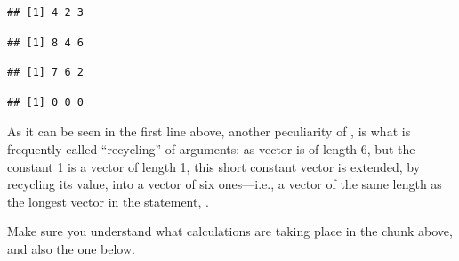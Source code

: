 \documentclass[krantz2]{krantz}\usepackage{knitr}
\begin{document}
\begin{knitrout}\footnotesize
{}\color{fgcolor}\begin{kframe}
\begin{alltt}
 \hlopt{+}  
\end{alltt}
\begin{verbatim}
## [1] 4 2 3
\end{verbatim}
\begin{alltt}
 \hlopt{+} \hlstd{)} \hlopt{*} 
\end{alltt}
\begin{verbatim}
## [1] 8 4 6
\end{verbatim}
\begin{alltt}
 \hlopt{+} 
\end{alltt}
\begin{verbatim}
## [1] 7 6 2
\end{verbatim}
\begin{alltt}
 \hlopt{-} 
\end{alltt}
\begin{verbatim}
## [1] 0 0 0
\end{verbatim}
\end{kframe}
\end{knitrout}

As it can be seen in the first line above, another peculiarity of \Rpgrm, is what is frequently called ``recycling'' of arguments: as vector  is of length 6, but the constant 1 is a vector of length 1, this short constant vector is extended, by recycling its value, into a vector of six ones---i.e., a vector of the same length as the longest vector in the statement, .\label{par:recycling:numeric}

Make sure you understand what calculations are taking place in the chunk above, and also the one below.
\end{document}
